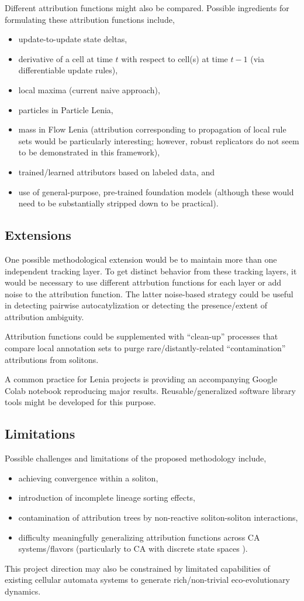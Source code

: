 Different attribution functions might also be compared.
Possible ingredients for formulating these attribution functions include,
\begin{itemize}
\item update-to-update state deltas,
\item derivative of a cell at time $t$ with respect to cell(s) at time $t-1$ (via differentiable update rules),
\item local maxima (current naive approach),
\item particles in Particle Lenia,
\item mass in Flow Lenia (attribution corresponding to propagation of local rule sets would be particularly interesting; however, robust replicators do not seem to be demonstrated in this framework),
\item trained/learned attributors based on labeled data, and
\item use of general-purpose, pre-trained foundation models (although these would need to be substantially stripped down to be practical).
\end{itemize}

\subsection{Extensions}

One possible methodological extension would be to maintain more than one independent tracking layer.
To get distinct behavior from these tracking layers, it would be necessary to use different attrbution functions for each layer or add noise to the attribution function.
The latter noise-based strategy could be useful in detecting pairwise autocatylization or detecting the presence/extent of attribution ambiguity.

Attribution functions could be supplemented with ``clean-up'' processes that compare local annotation sets to purge rare/distantly-related ``contamination'' attributions from solitons.

A common practice for Lenia projects is providing an accompanying Google Colab notebook reproducing major results.
Reusable/generalized software library tools might be developed for this purpose.

\subsection{Limitations}

Possible challenges and limitations of the proposed methodology include,
\begin{itemize}
\item achieving convergence within a soliton,
\item introduction of incomplete lineage sorting effects,
\item contamination of attribution trees by non-reactive soliton-soliton interactions,
\item difficulty meaningfully generalizing attribution functions across CA systems/flavors (particularly to CA with discrete state spaces \citep{miotti2025differentiable}).
\end{itemize}

This project direction may also be constrained by limitated capabilities of existing cellular automata systems to generate rich/non-trivial eco-evolutionary dynamics.
